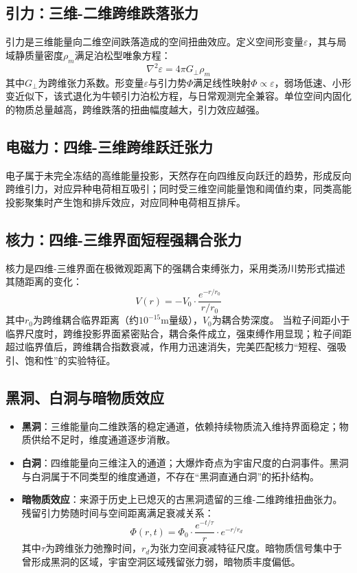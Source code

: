 \documentclass[12pt,a4paper]{ctexart}
\begin{document}
\subsection{引力：三维-二维跨维跌落张力}
引力是三维能量向二维空间跌落造成的空间扭曲效应。定义空间形变量$\varepsilon$，其与局域静质量密度$\rho_m$满足泊松型唯象方程：
\begin{equation}
\nabla^2 \varepsilon = 4\pi G_\perp \rho_m
\end{equation}
其中$G_\perp$为跨维张力系数。形变量$\varepsilon$与引力势$\Phi$满足线性映射$\Phi \propto \varepsilon$，弱场低速、小形变近似下，该式退化为牛顿引力泊松方程，与日常观测完全兼容。单位空间内固化的物质总量越高，跨维跌落的扭曲幅度越大，引力效应越强\cite{newton, chandrasekhar1965}。

\subsection{电磁力：四维-三维跨维跃迁张力}
电子属于未完全冻结的高维能量投影，天然存在向四维反向跃迁的趋势，形成反向跨维引力，对应异种电荷相互吸引；同时受三维空间能量饱和阈值约束，同类高能投影聚集时产生饱和排斥效应，对应同种电荷相互排斥\cite{jackson1998}。

\subsection{核力：四维-三维界面短程强耦合张力}
核力是四维-三维界面在极微观距离下的强耦合束缚张力，采用类汤川势形式描述其随距离的变化：
\begin{equation}
V(r) = -V_0 \cdot \frac{e^{-r/r_0}}{r/r_0}
\end{equation}
其中$r_0$为跨维耦合临界距离（约$10^{-15}\text{m}$量级），$V_0$为耦合势深度。
当粒子间距小于临界尺度时，跨维投影界面紧密贴合，耦合条件成立，强束缚作用显现；粒子间距超过临界值后，跨维耦合指数衰减，作用力迅速消失，完美匹配核力“短程、强吸引、饱和性”的实验特征\cite{yukawa1935, halzen1984}。

\subsection{黑洞、白洞与暗物质效应}
\begin{itemize}
\item \textbf{黑洞}：三维能量向二维跌落的稳定通道，依赖持续物质流入维持界面稳定；物质供给不足时，维度通道逐步消散\cite{hawking1974, chandrasekhar1983}。
\item \textbf{白洞}：四维能量向三维注入的通道；大爆炸奇点为宇宙尺度的白洞事件。黑洞与白洞属于不同类型的维度通道，不存在“黑洞直通白洞”的拓扑结构。
\item \textbf{暗物质效应}：来源于历史上已熄灭的古黑洞遗留的三维-二维跨维扭曲张力。残留引力势随时间与空间距离满足衰减关系：
\begin{equation}
\Phi(r,t) = \Phi_0 \cdot \frac{e^{-t/\tau}}{r} \cdot e^{-r/r_d}
\end{equation}
其中$\tau$为跨维张力弛豫时间，$r_d$为张力空间衰减特征尺度。暗物质信号集中于曾形成黑洞的区域，宇宙空洞区域残留张力弱，暗物质丰度偏低\cite{rubin1980, bertone2005}。
\end{itemize}
\end{document}
